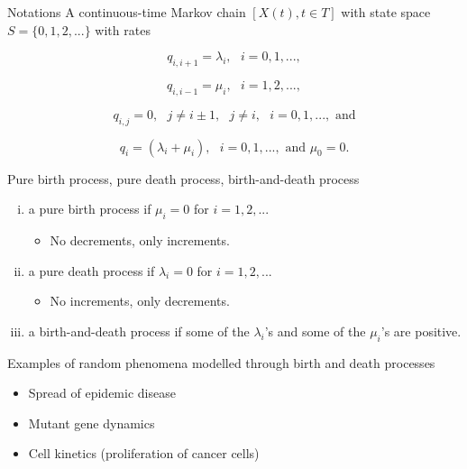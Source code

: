 \documentclass[12pt,ignorenonframetext,]{beamer}
\providecommand{\tightlist}{%
  \setlength{\itemsep}{0pt}\setlength{\parskip}{0pt}}
\begin{document}
\begin{frame}{Notations}
\protect\hypertarget{notations}{}
A continuous-time Markov chain \([X(t), t \in T]\) with state space
\(S = \{0, 1, 2, ...\}\) with rates

\[q_{i, i+1}=\lambda_i, \text{ } i= 0, 1, ...,\]

\[q_{i, i-1}=\mu_i, \text{ } i= 1, 2, ...,\]

\[q_{i, j}=0, \text{ } j \neq i \pm 1, \text{ } j \neq i, \text{ } i=0, 1, ..., \text{ and}\]

\[q_i = (\lambda_i + \mu_i), \text{ } i=0, 1, ..., \text{ and } \mu_0 = 0.\]
\end{frame}

\begin{frame}{Pure birth process, pure death process, birth-and-death
process}
\protect\hypertarget{pure-birth-process-pure-death-process-birth-and-death-process}{}
\begin{enumerate}
[i)]
\item
  a pure birth process if \(\mu_i = 0\) for \(i=1, 2, ...\)

  \begin{itemize}
  \tightlist
  \item
    No decrements, only increments.
  \end{itemize}
\item
  a pure death process if \(\lambda_i = 0\) for \(i=1, 2, ...\)

  \begin{itemize}
  \tightlist
  \item
    No increments, only decrements.
  \end{itemize}
\item
  a birth-and-death process if some of the \(\lambda_i\)'s and some of
  the \(\mu_i\)'s are positive.
\end{enumerate}
\end{frame}

\begin{frame}{Examples of random phenomena modelled through birth and
death processes}
\protect\hypertarget{examples-of-random-phenomena-modelled-through-birth-and-death-processes}{}
\begin{itemize}
\item
  Spread of epidemic disease
\item
  Mutant gene dynamics
\item
  Cell kinetics (proliferation of cancer cells)
\end{itemize}
\end{frame}
\end{document}
